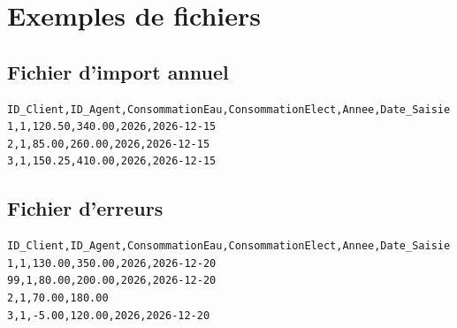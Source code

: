 \chapter{Exemples de fichiers}

\section{Fichier d'import annuel}

\begin{lstlisting}[caption={Consommation\_Annuelle.txt}]
ID_Client,ID_Agent,ConsommationEau,ConsommationElect,Annee,Date_Saisie
1,1,120.50,340.00,2026,2026-12-15
2,1,85.00,260.00,2026,2026-12-15
3,1,150.25,410.00,2026,2026-12-15
\end{lstlisting}

\section{Fichier d'erreurs}

\begin{lstlisting}[caption={Exemple de lignes invalides}]
ID_Client,ID_Agent,ConsommationEau,ConsommationElect,Annee,Date_Saisie
1,1,130.00,350.00,2026,2026-12-20
99,1,80.00,200.00,2026,2026-12-20
2,1,70.00,180.00
3,1,-5.00,120.00,2026,2026-12-20
\end{lstlisting}
